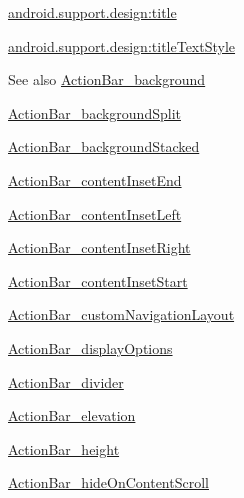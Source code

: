 {\ttfamily \hyperlink{classandroid_1_1support_1_1design_1_1R_1_1styleable_a0b7043e37b09ed435f5845bbad61bcb5}{android.\+support.\+design\+:title}}

{\ttfamily \hyperlink{classandroid_1_1support_1_1design_1_1R_1_1styleable_ace9dbdf383d562ec34cff99140bde632}{android.\+support.\+design\+:title\+Text\+Style}}

\begin{DoxySeeAlso}{See also}
\hyperlink{classandroid_1_1support_1_1design_1_1R_1_1styleable_af9f6c6b106dc74dcd8336736d77ea6ba}{Action\+Bar\+\_\+background} 

\hyperlink{classandroid_1_1support_1_1design_1_1R_1_1styleable_abdc8b34e1d44d2cbe5ba60c429ff7c24}{Action\+Bar\+\_\+background\+Split} 

\hyperlink{classandroid_1_1support_1_1design_1_1R_1_1styleable_a6efbd40c875995ff58dd2e0851d81c20}{Action\+Bar\+\_\+background\+Stacked} 

\hyperlink{classandroid_1_1support_1_1design_1_1R_1_1styleable_afbb050c8aaf116cb242a091ccb7c5494}{Action\+Bar\+\_\+content\+Inset\+End} 

\hyperlink{classandroid_1_1support_1_1design_1_1R_1_1styleable_ac3914ae6a9e8b6f287ff67404ab1e659}{Action\+Bar\+\_\+content\+Inset\+Left} 

\hyperlink{classandroid_1_1support_1_1design_1_1R_1_1styleable_ae5f3307b79082ad75d0a290ff147ad9b}{Action\+Bar\+\_\+content\+Inset\+Right} 

\hyperlink{classandroid_1_1support_1_1design_1_1R_1_1styleable_a294d9e006ce1ce1efabd52d819b94bb8}{Action\+Bar\+\_\+content\+Inset\+Start} 

\hyperlink{classandroid_1_1support_1_1design_1_1R_1_1styleable_a89b2c279c58515d140466f1c0f360aa1}{Action\+Bar\+\_\+custom\+Navigation\+Layout} 

\hyperlink{classandroid_1_1support_1_1design_1_1R_1_1styleable_abddf5b63a010ab2e2078e9c46e36e80c}{Action\+Bar\+\_\+display\+Options} 

\hyperlink{classandroid_1_1support_1_1design_1_1R_1_1styleable_a3de1d07d052e4c273b08980969a62a70}{Action\+Bar\+\_\+divider} 

\hyperlink{classandroid_1_1support_1_1design_1_1R_1_1styleable_a8e93fa7b188ab181bc2723837301eaff}{Action\+Bar\+\_\+elevation} 

\hyperlink{classandroid_1_1support_1_1design_1_1R_1_1styleable_a7e935cdf4fb18cfcd8e0e46a55688835}{Action\+Bar\+\_\+height} 

\hyperlink{classandroid_1_1support_1_1design_1_1R_1_1styleable_aaacf39cc520445677c982038b3f1c151}{Action\+Bar\+\_\+hide\+On\+Content\+Scroll} 


\end{DoxySeeAlso}
